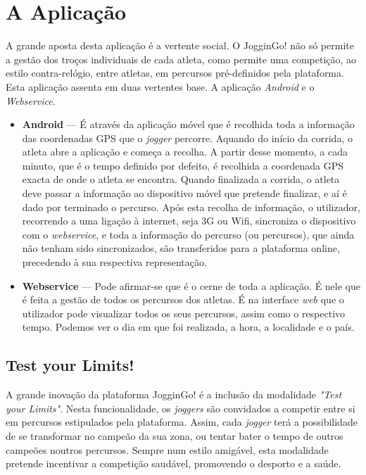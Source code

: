 \documentclass[twocolumn,twoside,10pt,a4paper]{article}
\begin{document}
\section{A Aplicação}\label{sec:application}

A grande aposta desta aplicação é a vertente social. O JogginGo! não só permite a gestão dos troços individuais de cada atleta, como permite uma competição, ao estilo contra-relógio, entre atletas, em percursos pré-definidos pela plataforma.
Esta aplicação assenta em duas vertentes base. A aplicação \textit{Android} e o \textit{Webservice}.
\begin{itemize}
\item \textbf{Android} --- É através da aplicação móvel que é recolhida toda a informação das coordenadas GPS que o \textit{jogger} percorre. Aquando do início da corrida, o atleta abre a aplicação e começa a recolha. A partir desse momento, a cada minuto, que é o tempo definido por defeito, é recolhida a coordenada GPS exacta de onde o atleta se encontra. Quando finalizada a corrida, o atleta deve passar a informação ao dispositivo móvel que pretende finalizar, e aí é dado por terminado o percurso. Após esta recolha de informação, o utilizador, recorrendo a uma ligação à internet, seja 3G ou Wifi, sincroniza o dispositivo com o \textit{webservice}, e toda a informação do percurso (ou percursos), que ainda não tenham sido sincronizados, são transferidos para a plataforma online, precedendo à sua respectiva representação.
\item \textbf{Webservice} --- Pode afirmar-se que é o cerne de toda a aplicação. É nele que é feita a gestão de todos os percursos dos atletas. É na interface \textit{web} que o utilizador pode visualizar todos os seus percursos, assim como o respectivo tempo. Podemos ver o dia em que foi realizada, a hora, a localidade e o país.
\end{itemize}

\subsection{Test your Limits!}
A grande inovação da plataforma JogginGo! é a inclusão da modalidade \textit{"Test your Limits"}. Nesta funcionalidade, os \textit{joggers} são convidados a competir entre si em percursos estipulados pela plataforma. Assim, cada \textit{jogger} terá a possibilidade de se transformar no campeão da sua zona, ou tentar bater o tempo de outros campeões noutros percursos. Sempre num estilo amigável, esta modalidade pretende incentivar a competição saudável, promovendo o desporto e a saúde.
\end{document}
